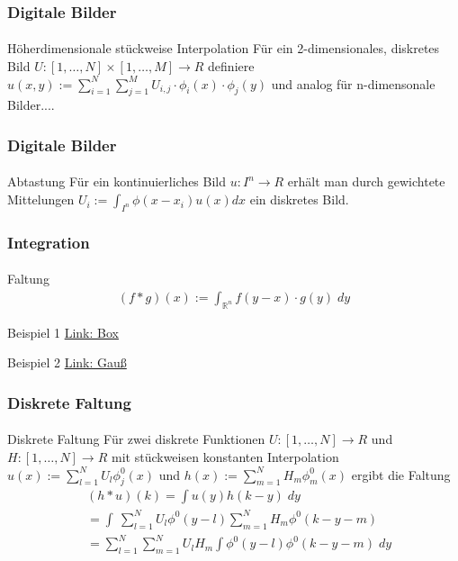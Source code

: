 \documentclass{beamer}
\begin{document}
\begin{frame}
    \frametitle{Digitale Bilder}
\framesubtitle{}
\begin{block}{Höherdimensionale stückweise  Interpolation}
Für ein 2-dimensionales, diskretes Bild $U : [1, \ldots, N] \times   [1, \ldots, M] \to R$ definiere 
 $u(x, y) := \sum_{i=1}^{N} \sum_{j=1}^{M}  U_{i,j} \cdot \phi_i(x) \cdot \phi_j(y)$ und analog für n-dimensonale Bilder....
\end{block}
 \end{frame}


\begin{frame}
    \frametitle{Digitale Bilder}
\framesubtitle{}
\begin{block}{Abtastung}
Für ein kontinuierliches  Bild $u : I^n \to R$ erhält man durch gewichtete Mittelungen
$U_i := \int_{I^n} \phi (x - x_i) u(x) dx$ ein diskretes Bild. 
\end{block}
 \end{frame}


\begin{frame}
    \frametitle{Integration}
\framesubtitle{}

    \begin{block}{Faltung}
\begin{align}
(f * g )(x) := \int_{\mathbb{R}^n}  f(y-x) \cdot g(y) \; dy 
\end{align}

\end{block}
    \begin{block}{Beispiel 1}
\href{https://moodle.dhbw-mannheim.de/pluginfile.php/278535/mod_folder/content/0/Convolution_of_box_signal_with_itself.gif?forcedownload=1}{Link: Box}
\end{block}
 
    \begin{block}{Beispiel 2}
\href{https://moodle.dhbw-mannheim.de/pluginfile.php/278535/mod_folder/content/0/Convolution_Animation_(Gaussian).gif?forcedownload=1}{Link: Gauß}
\end{block}
 
\end{frame}


\begin{frame}
    \frametitle{Diskrete Faltung}
\framesubtitle{}

    \begin{block}{Diskrete Faltung}
Für zwei diskrete  Funktionen $U : [1, \ldots, N]  \to R$ und $H : [1, \ldots, N]  \to R$ mit stückweisen konstanten Interpolation $u(x) := \sum_{l=1}^{N} U_l \phi^0_j(x)$ und 
$h(x) := \sum_{m=1}^{N} H_m \phi^0_m(x)$ ergibt die Faltung 
\begin{align*}
& (h * u)(k) = \int u(y)h(k-y)  \; dy \\
& = \int \ \sum_{l=1}^{N} U_l \phi^0(y-l) \sum_{m=1}^{N} H_m \phi^0(k-y-m) \\
& = \sum_{l=1}^{N}   \sum_{m=1}^{N} U_l  H_m  \int  \phi^0(y-l) \phi^0(k-y-m) \; dy 
\end{align*}

\end{block}
 \end{frame}
\end{document}
